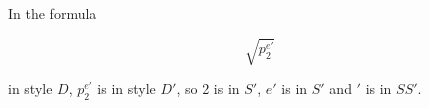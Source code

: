 In the formula

$$\sqrt{p^{e'}_2}$$

in style $D$, $p^{e'}_2$ is in style $D'$, so 2 is in $S'$, $e'$ is in $S'$
and $\prime$ is in $SS'$.

\bye


